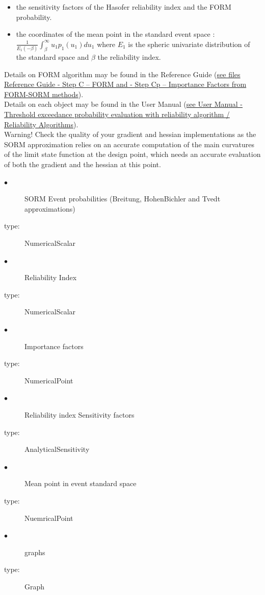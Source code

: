 \begin{itemize}
\item the sensitivity factors of the Hasofer reliability index and the FORM probability.
\item the coordinates of the mean point in the standard event space :  $\displaystyle \frac{1}{E_1(-\beta)}\int_{\beta}^{\infty} u_1 p_1(u_1)du_1$ where $E_1$ is the spheric univariate distribution of the standard space and $\beta$ the reliability index.
\end{itemize}



Details on FORM algorithm  may be found in the Reference Guide (\href{OpenTURNS_ReferenceGuide.pdf}{see files Reference Guide - Step C -- FORM and  - Step Cp -- Importance Factors from FORM-SORM methods}).\\


Details on each object may be found in the User Manual  (\href{OpenTURNS_UserManual_TUI.pdf}{see User Manual - Threshold exceedance probability evaluation with reliability algorithm / Reliability Algorithms}).\\


Warning! Check the quality of your gradient and hessian implementations as the SORM approximation relies on an accurate computation of the main curvatures of the limit state function at the design point, which needs an accurate evaluation of both the gradient and the hessian at this point. \\


{
  \begin{description}
  \item[$\bullet$] SORM Event probabilities (Breitung, HohenBichler and Tvedt approximations)
  \item[type:] NumericalScalar
  \item[$\bullet$] Reliability Index
  \item[type:] NumericalScalar
  \item[$\bullet$] Importance factors
  \item[type:] NumericalPoint
  \item[$\bullet$] Reliability index Sensitivity factors
  \item[type:] AnalyticalSensitivity
  \item[$\bullet$] Mean point in event standard space
  \item[type:] NuemricalPoint
  \item[$\bullet$] graphs
  \item[type:] Graph
  \end{description}
}

